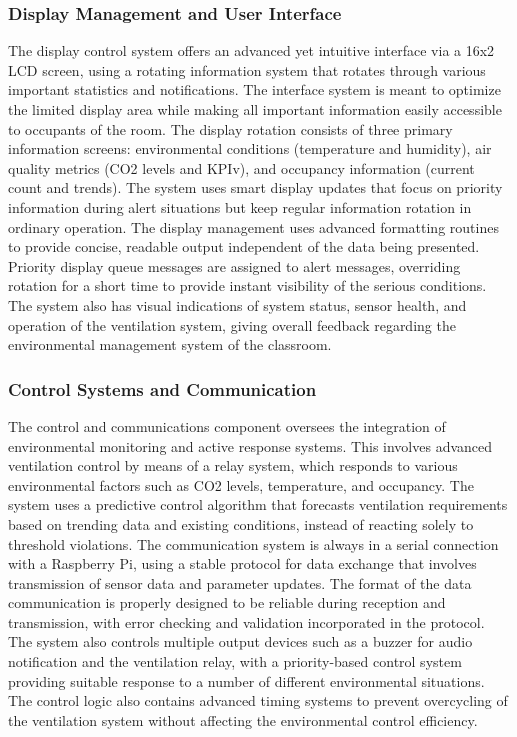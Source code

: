 \subsubsection{Display Management and User Interface}
The display control system offers an advanced yet intuitive interface via a 16x2 LCD screen, using a rotating information system that rotates through various important statistics and notifications. The interface system is meant to optimize the limited display area while making all important information easily accessible to occupants of the room. The display rotation consists of three primary information screens: environmental conditions (temperature and humidity), air quality metrics (CO2 levels and KPIv), and occupancy information (current count and trends). The system uses smart display updates that focus on priority information during alert situations but keep regular information rotation in ordinary operation. The display management uses advanced formatting routines to provide concise, readable output independent of the data being presented. Priority display queue messages are assigned to alert messages, overriding rotation for a short time to provide instant visibility of the serious conditions. The system also has visual indications of system status, sensor health, and operation of the ventilation system, giving overall feedback regarding the environmental management system of the classroom.

\subsubsection{ Control Systems and Communication}
The control and communications component oversees the integration of environmental monitoring and active response systems. This involves advanced ventilation control by means of a relay system, which responds to various environmental factors such as CO2 levels, temperature, and occupancy. The system uses a predictive control algorithm that forecasts ventilation requirements based on trending data and existing conditions, instead of reacting solely to threshold violations. The communication system is always in a serial connection with a Raspberry Pi, using a stable protocol for data exchange that involves transmission of sensor data and parameter updates. The format of the data communication is properly designed to be reliable during reception and transmission, with error checking and validation incorporated in the protocol. The system also controls multiple output devices such as a buzzer for audio notification and the ventilation relay, with a priority-based control system providing suitable response to a number of different environmental situations. The control logic also contains advanced timing systems to prevent overcycling of the ventilation system without affecting the environmental control efficiency.

